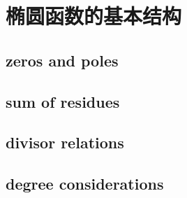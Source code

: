 \section{椭圆函数的基本结构}
\label{b3:sec:2202}


\subsection{zeros and poles}
\label{b3:subsec:220201}

\subsection{sum of residues}
\label{b3:subsec:220202}

\subsection{divisor relations}
\label{b3:subsec:220203}

\subsection{degree considerations}
\label{b3:subsec:220204}


